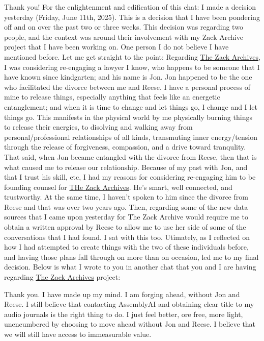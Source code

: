 \documentclass{article}
\begin{document}
Thank you! For the enlightenment and edification of this chat: I made a decision yesterday (Friday, June 11th, 2025). This is a decision that I have been pondering off and on over the past two or three weeks. This decision was regarding two people, and the context was around their involvement with my Zack Archive project that I have been working on. One person I do not believe I have mentioned before. Let me get straight to the point: Regarding \hyperlink{gloss:the_zack_archives}{The Zack Archives}, I was considering re-engaging a lawyer I know, who happens to be someone that I have known since kindgarten; and his name is Jon. Jon happened to be the one who facilitated the divorce between me and Reese. I have a personal process of mine to release things, especially anything that feels like an energetic entanglement; and when it is time to change and let things go, I change and I let things go. This manifests in the physical world by me physically burning things to release their energies, to disolving and walking away from personal/professional relationships of all kinds, transmuting inner energy/tension through the release of forgiveness, compassion, and a drive toward tranqulity. That said, when Jon became entangled with the divorce from Reese, then that is what caused me to release our relationship. Because of my past with Jon, and that I trust his skill, etc, I had my reasons for considering re-engaging him to be founding counsel for \hyperlink{gloss:the_zack_archives}{THe Zack Archives}. He's smart, well connected, and trustworthy. At the same time, I haven't spoken to him since the divorce from Reese and that was over two years ago. Then, regarding some of the new data sources that I came upon yesterday for The Zack Archive would require me to obtain a written approval by Reese to allow me to use her side of some of the conversations that I had found. I sat with this too. Utimately, as I reflected on how I had attempted to create things with the two of these individuals before, and having those plans fall through on more than on occasion, led me to my final decision. Below is what I wrote to you in another chat that you and I are having regarding \hyperlink{gloss:the_zack_archives}{The Zack Archives} project:

Thank you. I have made up my mind. I am forging ahead, without Jon and Reese. I still believe that contacting AssemblyAI and obtaining clear title to my audio journals is the right thing to do. I just feel better, ore free, more light, unencumbered by choosing to move ahead without Jon and Reese. I believe that we will still have access to immeasurable value.
\end{document}
